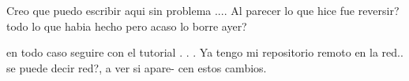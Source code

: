 Creo que puedo escribir aqui sin problema
....
Al parecer lo que hice fue reversir? todo lo que habia hecho
pero acaso lo borre ayer?

en todo caso seguire con el tutorial
.
.
.
Ya tengo mi repositorio remoto en la red.. se puede decir red?, a ver si apare-
cen estos cambios.
